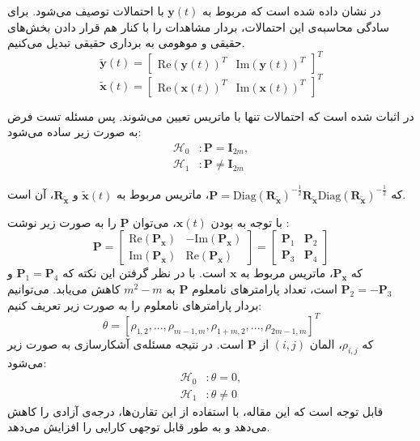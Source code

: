 در  نشان داده شده است که  مربوط به
$\mathbf{y}(t)$
با احتمالات  توصیف می‌شود. برای سادگی محاسبه‌ی این احتمالات، بردار مشاهدات را با کنار هم قرار دادن بخش‌های حقیقی و موهومی به برداری حقیقی تبدیل می‌کنیم.
\begin{equation}
	\tilde{\mathbf{y}}(t)=\begin{bmatrix}
		\mathrm{Re}(\mathbf{y}(t))^T & \mathrm{Im}(\mathbf{y}(t))^T
	\end{bmatrix}^T
\end{equation}
\begin{equation}
	\tilde{\mathbf{x}}(t)=\begin{bmatrix}
		\mathrm{Re}(\mathbf{x}(t))^T & \mathrm{Im}(\mathbf{x}(t))^T
	\end{bmatrix}^T
\end{equation}

در  اثبات شده است که احتمالات  تنها با ماتریس  تعیین می‌شوند. پس مسئله تست فرض به صورت زیر ساده می‌شود:
\begin{align}
	\mathcal{H}_0 &: \mathbf{P}=\mathbf{I}_{2m}, \\
	\mathcal{H}_1 &: \mathbf{P}\neq\mathbf{I}_{2m}
\end{align}

که 
$\mathbf{P}=\mathrm{Diag}(\mathbf{R}_{\tilde{\mathbf{x}}})^{-\frac{1}{2}}\mathbf{R}_{\tilde{\mathbf{x}}}\mathrm{Diag}(\mathbf{R}_{\tilde{\mathbf{x}}})^{-\frac{1}{2}}$،
ماتریس  مربوط به 
$\tilde{\mathbf{x}}(t)$
 و 
$\mathbf{R}_{\tilde{\mathbf{x}}}$،
 آن است.

با توجه به  بودن 
$\mathbf{x}(t)$،
می‌توان 
$\mathbf{P}$
را به صورت زیر نوشت :
\begin{equation}
	\mathbf{P}=\begin{bmatrix}
		\mathrm{Re}(\mathbf{P}_\mathbf{x}) & -\mathrm{Im}(\mathbf{P}_\mathbf{x}) \\
		\mathrm{Im}(\mathbf{P}_\mathbf{x}) & \mathrm{Re}(\mathbf{P}_\mathbf{x})
	\end{bmatrix}=\begin{bmatrix}
	\mathbf{P}_1 & \mathbf{P}_2 \\
	\mathbf{P}_3 & \mathbf{P}_4
	\end{bmatrix}
\end{equation}
که 
$\mathbf{P}_\mathbf{x}$،
ماتریس  مربوط به 
$\mathbf{x}$
است. با در نظر گرفتن این نکته که 
$\mathbf{P}_1=\mathbf{P}_4$
و
$\mathbf{P}_2=-\mathbf{P}_3$
است، تعداد پارامترهای نامعلوم 
$\mathbf{P}$
به 
$m^2-m$
کاهش می‌یابد.
می‌توانیم بردار پارامترهای نامعلوم را به صورت زیر تعریف کنیم:
\begin{equation}
	\theta=[\rho_{1,2}, ..., \rho_{m-1,m}, \rho_{1+m, 2}, ..., \rho_{2m-1, m}]^T
\end{equation}
که 
$\rho_{i, j}$،
المان 
$(i, j)$
از 
$\mathbf{P}$
است.
در نتیجه مسئله‌ی آشکارسازی به صورت زیر می‌شود:
\begin{align}
	\mathcal{H}_0 &: \theta=0, \\
	\mathcal{H}_1 &: \theta\neq0
\end{align}
قابل توجه است که این مقاله، با استفاده از این تقارن‌ها، درجه‌ی آزادی را کاهش می‌دهد و به طور قابل توجهی کارایی  را افزایش می‌دهد.

